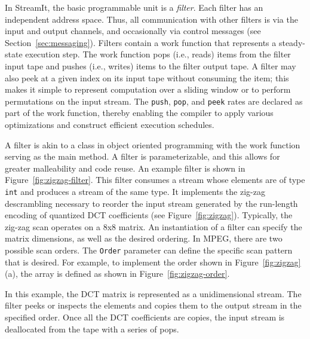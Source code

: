 In StreamIt, the basic programmable unit is a {\it filter}.  Each
filter has an independent address space. Thus, all communication with
other filters is via the input and output channels, and occasionally
via control messages (see Section~\ref{sec:messaging}).  Filters
contain a work function that represents a steady-state execution step.
The work function pops (i.e., reads) items from the filter input tape
and pushes (i.e., writes) items to the filter output tape. A filter
may also peek at a given index on its input tape without consuming the
item; this makes it simple to represent computation over a sliding
window or to perform permutations on the input stream. The {\tt push},
{\tt pop}, and {\tt peek} rates are declared as part of the work
function, thereby enabling the compiler to apply various optimizations
and construct efficient execution schedules.

A filter is akin to a class in object oriented programming with the
work function serving as the main method. A filter is parameterizable,
and this allows for greater malleability and code reuse. An example
filter is shown in Figure~\ref{fig:zigzag-filter}. This filter
consumes a stream whose elements are of type {\tt int} and produces a
stream of the same type. It implements the zig-zag descrambling
necessary to reorder the input stream generated by the run-length
encoding of quantized DCT coefficients (see
Figure~\ref{fig:zigzag}). Typically, the zig-zag scan operates on a
8x8 matrix. An instantiation of a filter can specify the matrix
dimensions, as well as the desired ordering. In MPEG, there are two
possible scan orders. The {\tt Order} parameter can define the
specific scan pattern that is desired. For example, to implement the
order shown in Figure~\ref{fig:zigzag}(a), the array is defined as
shown in Figure~\ref{fig:zigzag-order}.

In this example, the DCT matrix is represented as a unidimensional
stream. The filter peeks or inspects the elements and copies them to
the output stream in the specified order. Once all the DCT
coefficients are copies, the input stream is deallocated from the tape
with a series of pops.

